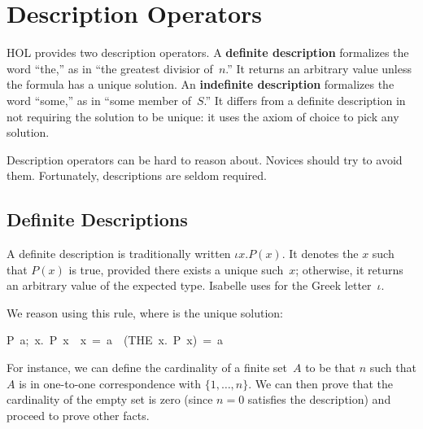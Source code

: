 \section{Description Operators}
\label{sec:SOME}

%
HOL provides two description operators.
A \textbf{definite description} formalizes the word ``the,'' as in
``the greatest divisior of~$n$.''
It returns an arbitrary value unless the formula has a unique solution.
An \textbf{indefinite description} formalizes the word ``some,'' as in
``some member of~$S$.''  It differs from a definite description in not
requiring the solution to be unique: it uses the axiom of choice to pick any
solution. 

\begin{warn}
Description operators can be hard to reason about.  Novices
should try to avoid them.  Fortunately, descriptions are seldom required.
\end{warn}

\subsection{Definite Descriptions}

%
A definite description is traditionally written $\iota x.  P(x)$.  It denotes
the $x$ such that $P(x)$ is true, provided there exists a unique such~$x$;
otherwise, it returns an arbitrary value of the expected type.
Isabelle uses  for the Greek letter~$\iota$.  


We reason using this rule, where  is the unique solution:
\begin{isabelle}
\isasymlbrakk P\ a;\ \isasymAnd x.\ P\ x\ \isasymLongrightarrow \ x\ =\ a\isasymrbrakk \ 
\isasymLongrightarrow \ (THE\ x.\ P\ x)\ =\ a%
\end{isabelle}
For instance, we can define the
cardinality of a finite set~$A$ to be that
$n$ such that $A$ is in one-to-one correspondence with $\{1,\ldots,n\}$.  We can then
prove that the cardinality of the empty set is zero (since $n=0$ satisfies the
description) and proceed to prove other facts.


